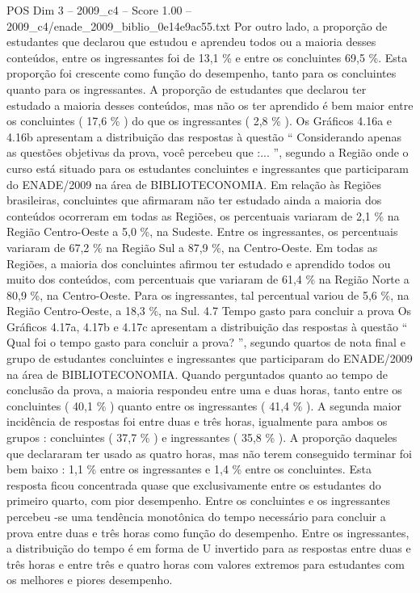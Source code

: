 \begin{textsample}{POS Dim 3 – 2009\_c4 – Score 1.00 – 2009\_c4/enade\_2009\_biblio\_0e14e9ac55.txt}
Por outro lado, a proporção de estudantes que declarou que estudou e aprendeu todos ou a maioria desses conteúdos, entre os ingressantes foi de 13,1 \% e entre os concluintes 69,5 \%.
Esta proporção foi crescente como função do desempenho, tanto para os concluintes quanto para os ingressantes.
A proporção de estudantes que declarou ter estudado a maioria desses conteúdos, mas não os ter aprendido é bem maior entre os concluintes ( 17,6 \% ) do que os ingressantes ( 2,8 \% ).
Os Gráficos 4.16a e 4.16b apresentam a distribuição das respostas à questão “ Considerando apenas as questões objetivas da prova, você percebeu que :... ”, segundo a Região onde o curso está situado para os estudantes concluintes e ingressantes que participaram do ENADE/2009 na área de BIBLIOTECONOMIA.
Em relação às Regiões brasileiras, concluintes que afirmaram não ter estudado ainda a maioria dos conteúdos ocorreram em todas as Regiões, os percentuais variaram de 2,1 \% na Região Centro-Oeste a 5,0 \%, na Sudeste.
Entre os ingressantes, os percentuais variaram de 67,2 \% na Região Sul a 87,9 \%, na Centro-Oeste.
Em todas as Regiões, a maioria dos concluintes afirmou ter estudado e aprendido todos ou muito dos conteúdos, com percentuais que variaram de 61,4 \% na Região Norte a 80,9 \%, na Centro-Oeste.
Para os ingressantes, tal percentual variou de 5,6 \%, na Região Centro-Oeste, a 18,3 \%, na Sul. 4.7 Tempo gasto para concluir a prova Os Gráficos 4.17a, 4.17b e 4.17c apresentam a distribuição das respostas à questão “ Qual foi o tempo gasto para concluir a prova? ”, segundo quartos de nota final e grupo de estudantes concluintes e ingressantes que participaram do ENADE/2009 na área de BIBLIOTECONOMIA.
Quando perguntados quanto ao tempo de conclusão da prova, a maioria respondeu entre uma e duas horas, tanto entre os concluintes ( 40,1 \% ) quanto entre os ingressantes ( 41,4 \% ).
A segunda maior incidência de respostas foi entre duas e três horas, igualmente para ambos os grupos : concluintes ( 37,7 \% ) e ingressantes ( 35,8 \% ).
A proporção daqueles que declararam ter usado as quatro horas, mas não terem conseguido terminar foi bem baixo : 1,1 \% entre os ingressantes e 1,4 \% entre os concluintes.
Esta resposta ficou concentrada quase que exclusivamente entre os estudantes do primeiro quarto, com pior desempenho.
Entre os concluintes e os ingressantes percebeu -se uma tendência monotônica do tempo necessário para concluir a prova entre duas e três horas como função do desempenho.
Entre os ingressantes, a distribuição do tempo é em forma de U invertido para as respostas entre duas e três horas e entre três e quatro horas com valores extremos para estudantes com os melhores e piores desempenho.

\end{textsample}

